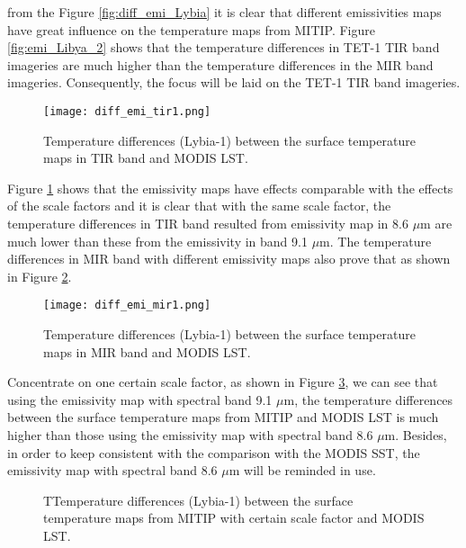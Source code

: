\noindent from the Figure \ref{fig:diff_emi_Lybia} it is clear that different emissivities maps have great influence on the temperature maps from MITIP.  Figure \ref{fig:emi_Libya_2} shows that the temperature differences in TET-1 TIR band imageries are much higher than the temperature differences in the MIR band imageries. Consequently, the focus will be laid on the TET-1 TIR band imageries.\\

\begin{figure}[!htbp]
\centering
\texttt{[image: diff\_emi\_tir1.png]}
\caption{Temperature differences (Lybia-1) between the surface temperature maps in TIR band and MODIS LST.}
\label{fig:diff_emi_tir1}
\end{figure}

\noindent Figure \ref{fig:diff_emi_tir1} shows that the emissivity maps have effects comparable with the effects of the scale factors and it is clear that with the same scale factor, the temperature differences in TIR band resulted from emissivity map in 8.6 $\mu$m are much lower than these from the emissivity in band 9.1 $\mu$m. The temperature differences in MIR band with different emissivity maps also prove that as shown in Figure \ref{fig:diff_emi_mir1}.\\

\begin{figure}[!htbp]
\centering
\texttt{[image: diff\_emi\_mir1.png]}
\caption{Temperature differences (Lybia-1) between the surface temperature maps in MIR band and MODIS LST.}
\label{fig:diff_emi_mir1}
\end{figure}

\noindent Concentrate on one certain scale factor, as shown in Figure \ref{fig:diff_emi_Lybia2}, we can see that using the emissivity map with spectral band 9.1 $\mu$m, the temperature differences between the surface temperature maps from MITIP and MODIS LST is much higher than those using the emissivity map with spectral band 8.6 $\mu$m. Besides, in order to keep consistent with the comparison with the MODIS SST, the emissivity map with spectral band 8.6 $\mu$m will be reminded in use.\\

\begin{figure}[!htbp]
\centering
{}
\hspace{0.5in}
\caption{TTemperature differences (Lybia-1) between the surface temperature maps from MITIP with certain scale factor and MODIS LST.}
\label{fig:diff_emi_Lybia2}
\end{figure}

